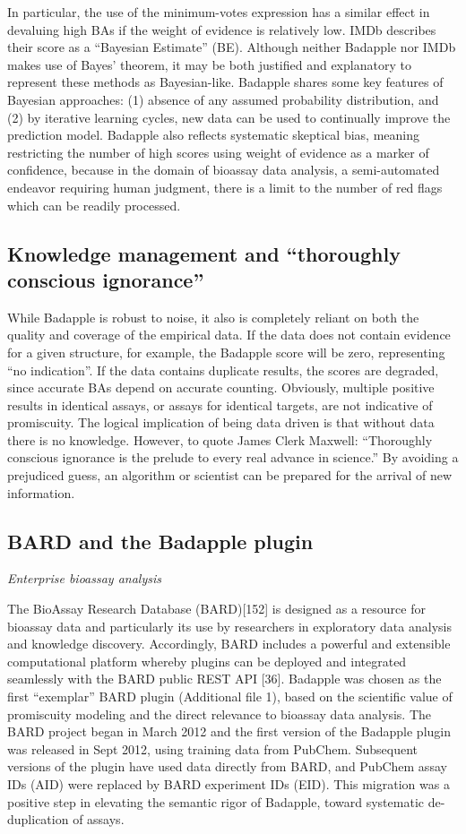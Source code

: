 In particular, the use of the minimum-votes expression has a similar effect in devaluing high BAs if the weight of evidence is relatively low. IMDb describes their score as a “Bayesian Estimate” (BE). Although neither Badapple nor IMDb makes use of Bayes’ theorem, it may be both justified and explanatory to represent these methods as Bayesian-like. Badapple shares some key features of Bayesian approaches: (1) absence of any assumed probability distribution, and (2) by iterative learning cycles, new data can be used to continually improve the prediction model. Badapple also reflects systematic skeptical bias, meaning restricting the number of high scores using weight of evidence as a marker of confidence, because in the domain of bioassay data analysis, a semi-automated endeavor requiring human judgment, there is a limit to the number of red flags which can be readily processed.

\subsection{Knowledge management and “thoroughly conscious ignorance”}

While Badapple is robust to noise, it also is completely reliant on both the quality and coverage of the empirical data. If the data does not contain evidence for a given structure, for example, the Badapple score will be zero, representing “no indication”. If the data contains duplicate results, the scores are degraded, since accurate BAs depend on accurate counting. Obviously, multiple positive results in identical assays, or assays for identical targets, are not indicative of promiscuity. The logical implication of being data driven is that without data there is no knowledge. However, to quote James Clerk Maxwell: “Thoroughly conscious ignorance is the prelude to every real advance in science.” By avoiding a prejudiced guess, an algorithm or scientist can be prepared for the arrival of new information.

\subsection{BARD and the Badapple plugin}

\emph{Enterprise bioassay analysis}

The BioAssay Research Database (BARD)[152] is designed as a resource for bioassay data and particularly its use by researchers in exploratory data analysis and knowledge discovery. Accordingly, BARD includes a powerful and extensible computational platform whereby plugins can be deployed and integrated seamlessly with the BARD public REST API [36]. Badapple was chosen as the first “exemplar” BARD plugin (Additional file 1), based on the scientific value of promiscuity modeling and the direct relevance to bioassay data analysis. The BARD project began in March 2012 and the first version of the Badapple plugin was released in Sept 2012, using training data from PubChem. Subsequent versions of the plugin have used data directly from BARD, and PubChem assay IDs (AID) were replaced by BARD experiment IDs (EID). This migration was a positive step in elevating the semantic rigor of Badapple, toward systematic de-duplication of assays.

